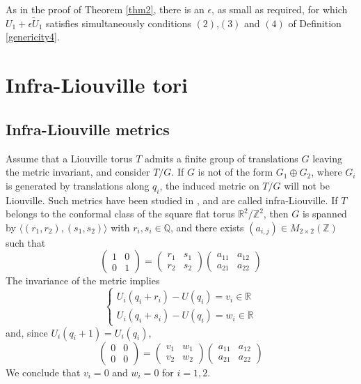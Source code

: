 \documentclass[12pt]{amsart}
\numberwithin{equation}{subsection}
\theoremstyle{definition}
\theoremstyle{plain}
\begin{document}
As in the proof of Theorem \ref{thm2},
there is an $\epsilon$, as small as required, for which $U_1 +\epsilon \tilde{U}_1$ satisfies simultaneously
conditions $(2)$,$(3)$ and $(4)$ of Definition \ref{genericity4}.

\section{Infra-Liouville tori}
\label{section24}
\subsection{Infra-Liouville metrics}
Assume that a Liouville torus $T$ admits a finite group of translations $G$ leaving the metric invariant, and consider $T/G$.
If $G$
is not of the form $G_1 \oplus G_2$, where $G_i$ is generated by translations along $q_i$, the induced metric
on $T/G$ will not be Liouville. Such metrics have been studied in \cite{3}, and are called infra-Liouville.
If  $T$ belongs to the conformal class of the square
flat torus $\mathbb{R}^2 / \mathbb{Z}^2$, then $G$ is spanned by $\langle (r_1,r_2),(s_1,s_2) \rangle$ with
$r_i,s_i \in \mathbb{Q}$, and there exists $(a_{i,j}) \in M_{2 \times 2}(\mathbb{Z})$ such that
\[
\left( \begin{array}{cccc} 1 & 0 \\ 0 & 1 \end{array} \right)
=
\left( \begin{array}{cccc} r_1 & s_1 \\ r_2 & s_2 \end{array} \right)
\left( \begin{array}{cccc} a_{11} & a_{12} \\ a_{21} & a_{22} \end{array} \right)
\]
The invariance of the metric implies
\[
\begin{cases}
U_i(q_i+r_i)-U(q_i)=v_i \in \mathbb{R}\\
U_i(q_i+s_i)-U(q_i)=w_i \in \mathbb{R}
\end{cases}
\]
and, since $U_i(q_i+1)=U_i(q_i)$,
\[
\left( \begin{array}{cccc} 0 & 0 \\ 0 & 0  \end{array} \right)
=
\left( \begin{array}{cccc}   v_1  &   w_1       \\   v_2    &   w_2     \end{array} \right)
\left( \begin{array}{cccc} a_{11} & a_{12} \\ a_{21} & a_{22} \end{array} \right)
\]
We conclude that $v_i=0$ and $w_i=0$ for $i=1,2$.
\end{document}
